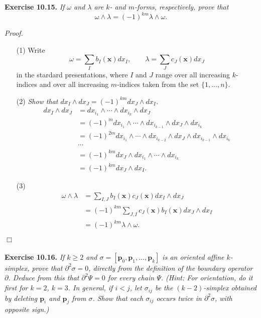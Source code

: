 \documentclass{article}
\begin{document}



\textbf{Exercise 10.15.}
\emph{If $\omega$ and $\lambda$ are $k$- and $m$-forms, respectively,
prove that}
\[
  \omega \wedge \lambda = (-1)^{km} \lambda \wedge \omega.
\]

\emph{Proof.}
\begin{enumerate}
\item[(1)]
  Write
  \[
    \omega = \sum_I b_I(\mathbf{x}) dx_I,
    \qquad
    \lambda = \sum_J c_J(\mathbf{x}) dx_J
  \]
  in the stardard presentations,
  where $I$ and $J$ range over all increasing $k$-indices
  and over all increasing $m$-indices taken from the set $\{1,\ldots,n\}$.

\item[(2)]
  \emph{Show that $dx_I \wedge dx_J = (-1)^{km} dx_J \wedge dx_I$.}
  \begin{align*}
    dx_I \wedge dx_J
    &= dx_{i_1} \wedge \cdots \wedge dx_{i_k}
      \wedge dx_J \\
    &= (-1)^m dx_{i_1} \wedge \cdots \wedge dx_{i_{k-1}}
      \wedge dx_J \wedge dx_{i_{k}} \\
    &= (-1)^{2m} dx_{i_1} \wedge \cdots \wedge dx_{i_{k-2}}
      \wedge dx_J \wedge dx_{i_{k-1}} \wedge dx_{i_{k}} \\
    &\cdots \\
    &= (-1)^{km} dx_J
      \wedge dx_{i_1} \wedge \cdots \wedge dx_{i_k} \\
    &= (-1)^{km} dx_J \wedge dx_I.
  \end{align*}

\item[(3)]
  \begin{align*}
    \omega \wedge \lambda
    &= \sum_{I,J} b_I(\mathbf{x}) c_J(\mathbf{x}) dx_I \wedge dx_J \\
    &= (-1)^{km} \sum_{J,I} c_J(\mathbf{x}) b_I(\mathbf{x}) dx_J \wedge dx_I \\
    &= (-1)^{km} \lambda \wedge \omega.
  \end{align*}
\end{enumerate}
$\Box$ \\\\






\textbf{Exercise 10.16.}
\emph{If $k \geq 2$ and $\sigma = [\mathbf{p}_0,\mathbf{p}_1,\ldots,\mathbf{p}_k]$
is an oriented affine $k$-simplex, prove that $\partial^2 \sigma = 0$,
directly from the definition of the boundary operator $\partial$.
Deduce from this that $\partial^2 \Psi = 0$ for every chain $\Psi$.
(Hint: For orientation, do it first for $k=2$, $k=3$.
In general, if $i < j$, let $\sigma_{ij}$ be the $(k-2)$-simplex obtained by
deleting $\mathbf{p}_i$ and $\mathbf{p}_j$ from $\sigma$.
Show that each $\sigma_{ij}$ occurs twice in $\partial^2\sigma$, with opposite sign.)} \\
\end{document}
